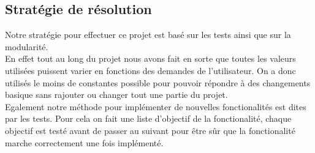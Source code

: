 \subsection{Stratégie de résolution}

    Notre stratégie pour effectuer ce projet est basé sur les tests ainsi que sur la modularité. \\
    En effet tout au long du projet nous avons fait  en sorte que toutes les valeurs utilisées puissent varier en fonctions des demandes de l'utilisateur. On a donc utilisés le moins de constantes possible pour pouvoir répondre à des changements basique sans rajouter ou changer tout une partie du projet. \\
    Egalement notre méthode pour implémenter de nouvelles fonctionalités est dites par les tests. Pour cela on fait une liste d'objectif de la fonctionalité, chaque objectif est testé avant de passer au suivant pour être sûr que la fonctionalité marche correctement une fois implémenté.